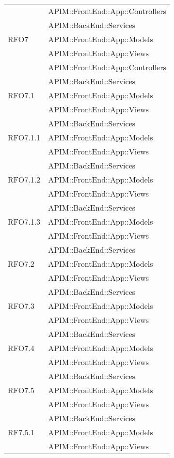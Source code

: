 \begin{longtable}{ p{4cm} | p{12cm} }
			& APIM::FrontEnd::App::Controllers \\
			& APIM::BackEnd::Services \\
			\hline		
			RFO7
			& APIM::FrontEnd::App::Models \\
			& APIM::FrontEnd::App::Views \\
			& APIM::FrontEnd::App::Controllers \\
			& APIM::BackEnd::Services \\
			\hline		
			RFO7.1
			& APIM::FrontEnd::App::Models \\
			& APIM::FrontEnd::App::Views \\
			& APIM::BackEnd::Services \\
			\hline		
			RFO7.1.1
			& APIM::FrontEnd::App::Models \\
			& APIM::FrontEnd::App::Views \\
			& APIM::BackEnd::Services \\
			\hline		
			RFO7.1.2
			& APIM::FrontEnd::App::Models \\
			& APIM::FrontEnd::App::Views \\
			& APIM::BackEnd::Services \\
			\hline		
			RFO7.1.3
			& APIM::FrontEnd::App::Models \\
			& APIM::FrontEnd::App::Views \\
			& APIM::BackEnd::Services \\
			\hline		
			RFO7.2
			& APIM::FrontEnd::App::Models \\
			& APIM::FrontEnd::App::Views \\
			& APIM::BackEnd::Services \\
			\hline		
			RFO7.3
			& APIM::FrontEnd::App::Models \\
			& APIM::FrontEnd::App::Views \\
			& APIM::BackEnd::Services \\
			\hline		
			RFO7.4
			& APIM::FrontEnd::App::Models \\
			& APIM::FrontEnd::App::Views \\
			& APIM::BackEnd::Services \\
			\hline	
			RFO7.5
			& APIM::FrontEnd::App::Models \\
			& APIM::FrontEnd::App::Views \\
			& APIM::BackEnd::Services \\
			\hline			
			RF7.5.1
			& APIM::FrontEnd::App::Models \\
			& APIM::FrontEnd::App::Views \\

\end{longtable}
